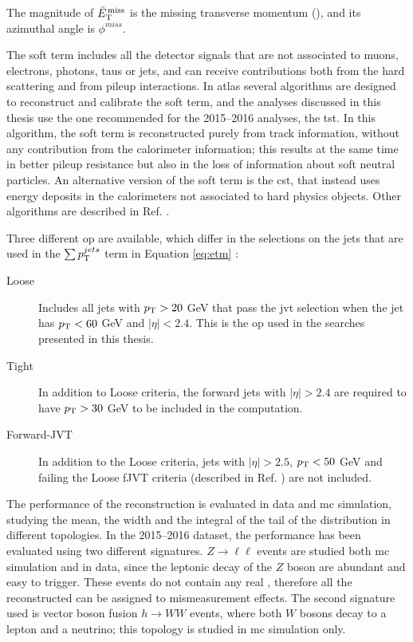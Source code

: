 \noindent The magnitude of $\bar{E}_{\rm{T}}^{\,\rm{miss}}$ is the missing transverse momentum (\met), and 
its azimuthal angle is $\phi^{miss}$.

The soft term includes all the detector signals that are not associated to muons, electrons, photons, taus or jets, and can receive contributions
both from the hard scattering and from pileup interactions. 
In \gls{atlas} several algorithms are designed to reconstruct and calibrate the \met soft term, and the analyses discussed in this thesis use 
the one recommended for the 2015--2016 analyses, the \gls{tst}. In this algorithm, the \met soft term is reconstructed purely from track information, without any contribution from the calorimeter information; 
this results at the same time in better pileup resistance but also in the loss of information about soft neutral particles. 
An alternative version of the soft term is the \gls{cst}, that instead uses energy deposits in the calorimeters not associated to hard physics objects. 
Other algorithms are described in Ref. \cite{Aad:2016nrq}.

Three different \met \gls{op} are available, which differ in the selections on the jets that are used in the $\sum p_{\rm T} ^{jets} $ term in 
Equation \ref{eq:etm} \cite{ATLAS-CONF-2018-023}:

\begin{description}
\item[Loose] Includes all jets with $p_{\rm T}>20$ GeV that pass the \gls{jvt} selection when the jet has $p_{\rm T}<60$ GeV and $|\eta|<2.4$. This is the \gls{op} used in the searches presented in this thesis. 

\item[Tight] In addition to Loose criteria, the forward jets with $|\eta|>2.4$ are required to have $p_{\rm T}>30$ GeV to be included in the \met computation.

\item[Forward-JVT] In addition to the Loose criteria, jets with $|\eta|>2.5$, $p_{\rm T}<50$ GeV and failing the Loose fJVT criteria (described in Ref. \cite{Aaboud:2017pou}) are not included. 

\end{description}

The performance of the \met reconstruction is evaluated in data and \gls{mc} simulation, studying the mean, the width and the integral of the 
tail of the \met distribution in different topologies. 
In the 2015--2016 dataset, the \met performance has been evaluated using two different signatures. 
$Z \rightarrow \ell \ell$ events are studied both \gls{mc} simulation and in data, since the leptonic decay of the $Z$ boson are 
abundant and easy to trigger. 
These events do not contain any real \met, therefore all the reconstructed \met can be assigned to mismeasurement effects. 
The second signature used is vector boson fusion $h \rightarrow WW$ events, where both $W$ bosons decay to 
a lepton and a neutrino; this topology is studied in \gls{mc} simulation only. 

